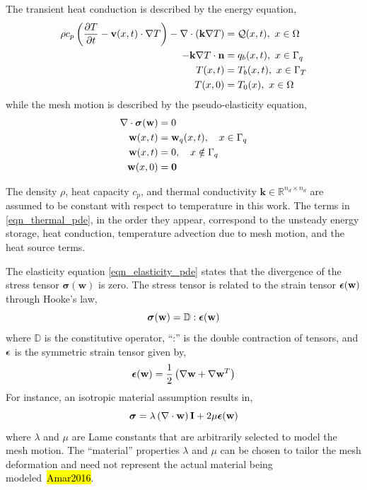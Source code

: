 The transient heat conduction is described by the energy equation,
\begin{subequations}
    \begin{align}
        \rho c_p\left(\ppt{T} - \mathbf{v}(x,t)\cdot\nabla T\right) - \nabla\cdot (\mathbf{k}\nabla T) &= \cQ(x,t),\ x\in\Omega \label{eqn_thermal_pde}\\
        -\mathbf{k}\nabla T\cdot \vn &= q_b(x,t),\ x\in\Gamma_q\label{eqn_thermal_bc_neumann}\\
        T(x,t) &= T_b(x,t),\ x\in\Gamma_T\label{eqn_thermal_bc_dirichlet}\\
        T(x,0) &= T_0(x),\ x\in\Omega\label{eqn_thermal_ic}
    \end{align}\label{eqn_governing_equations}
\end{subequations}
while the mesh motion is described by the pseudo-elasticity equation,
\begin{subequations}
    \begin{align}
        \nabla\cdot\boldsymbol{\sigma}(\mathbf{w}) &= 0\label{eqn_elasticity_pde}\\
        \mathbf{w}(x,t) &= \mathbf{w}_q(x,t),\quad x\in\Gamma_q\label{eqn_displacement_heated_bc}\\
        \mathbf{w}(x,t) &= 0,\quad x\notin \Gamma_q\label{eqn_displacement_unheated_bc}\\
        \mathbf{w}(x,0) &= \boldsymbol{0}\label{eqn_displacement_initial_condition}
    \end{align}
\end{subequations}

The density $\rho$, heat capacity $c_p$, and thermal conductivity $\mathbf{k}\in\mathbb{R}^{n_d\times n_d}$ are assumed to be constant with respect to temperature in this work. The terms in \cref{eqn_thermal_pde}, in the order they appear, correspond to the unsteady energy storage, heat conduction, temperature advection due to mesh motion, and the heat source terms. 

The elasticity equation \cref{eqn_elasticity_pde} states that the divergence of the stress tensor $\boldsymbol{\sigma}(\mathbf{w})$ is zero. The stress tensor is related to the strain tensor $\boldsymbol{\epsilon}(\mathbf{w})$ through Hooke's law,
\[
    \boldsymbol{\sigma}(\mathbf{w}) = \mathbb{D}:\boldsymbol{\epsilon}(\mathbf{w})
\]
where $\mathbb{D}$ is the constitutive operator, ``:'' is the double contraction of tensors, and $\boldsymbol{\epsilon}$ is the symmetric strain tensor given by,
\[
    \boldsymbol{\epsilon}(\mathbf{w}) = \frac{1}{2}\left(\nabla\mathbf{w} + \nabla\mathbf{w}^T\right)
\]
For instance, an isotropic material assumption results in,
\[
    \boldsymbol{\sigma} = \lambda\left(\nabla\cdot\mathbf{w}\right) \mathbf{I} + 2\mu\boldsymbol{\epsilon}(\mathbf{w})
\]
where $\lambda$ and $\mu$ are Lame constants that are arbitrarily selected to model the mesh motion. The ``material'' properties $\lambda$ and $\mu$ can be chosen to tailor the mesh deformation and need not represent the actual material being modeled~\hl{Amar2016}. 

